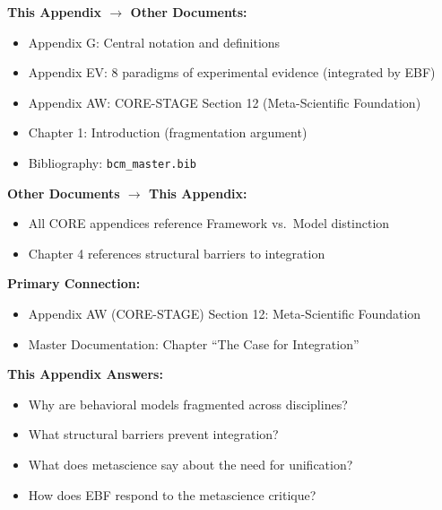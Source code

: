 \begin{tcolorbox}[colback=gray!5!white, colframe=gray!75!black,
    title=\textbf{Cross-Reference Map}]

\textbf{This Appendix $\rightarrow$ Other Documents:}
\begin{itemize}[nosep]
    \item Appendix G: Central notation and definitions
    \item Appendix EV: 8 paradigms of experimental evidence (integrated by EBF)
    \item Appendix AW: CORE-STAGE Section 12 (Meta-Scientific Foundation)
    \item Chapter 1: Introduction (fragmentation argument)
    \item Bibliography: \texttt{bcm\_master.bib}
\end{itemize}

\textbf{Other Documents $\rightarrow$ This Appendix:}
\begin{itemize}[nosep]
    \item All CORE appendices reference Framework vs.\ Model distinction
    \item Chapter 4 references structural barriers to integration
\end{itemize}

\end{tcolorbox}

\begin{tcolorbox}[colback=purple!5!white, colframe=purple!75!black,
    title=Chapter Linkage]

\textbf{Primary Connection:}
\begin{itemize}[nosep]
\item Appendix AW (CORE-STAGE) Section 12: Meta-Scientific Foundation
\item Master Documentation: Chapter ``The Case for Integration''
\end{itemize}

\textbf{This Appendix Answers:}
\begin{itemize}[nosep]
\item Why are behavioral models fragmented across disciplines?
\item What structural barriers prevent integration?
\item What does metascience say about the need for unification?
\item How does EBF respond to the metascience critique?
\end{itemize}

\end{tcolorbox}

